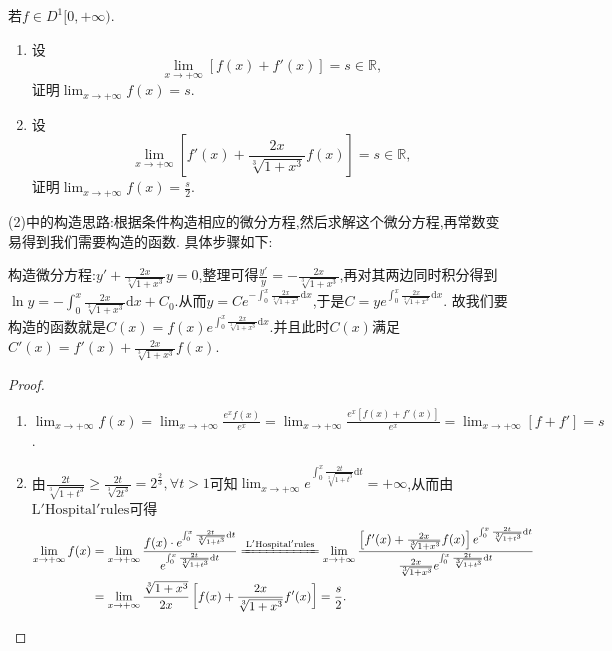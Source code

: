 \documentclass[../../main.tex]{subfiles}%
\begin{document}
\begin{example}
若\(f\in D^1[0,+\infty)\).
\begin{enumerate}[(1)]
\item 设
\[
\lim_{x\rightarrow +\infty}[f(x)+f'(x)] = s\in\mathbb{R},
\]
证明\(\lim_{x\rightarrow +\infty}f(x)=s\).

\item 设
\[
\lim_{x\rightarrow +\infty}\left[f'(x)+\frac{2x}{\sqrt[3]{1 + x^{3}}}f(x)\right]=s\in\mathbb{R},
\]
证明\(\lim_{x\rightarrow +\infty}f(x)=\frac{s}{2}\).
\end{enumerate}
\end{example}
\begin{note}
(2)中的构造思路:根据条件构造相应的微分方程,然后求解这个微分方程,再常数变易得到我们需要构造的函数. 具体步骤如下:

构造微分方程:\(y'+\frac{2x}{\sqrt[3]{1 + x^3}}y = 0\),整理可得\(\frac{y'}{y}=-\frac{2x}{\sqrt[3]{1 + x^3}}\),再对其两边同时积分得到\(\ln y = -\int_{0}^{x}\frac{2x}{\sqrt[3]{1 + x^3}}\mathrm{d}x + C_0\).从而\(y = Ce^{-\int_{0}^{x}\frac{2x}{\sqrt[3]{1 + x^3}}\mathrm{d}x}\),于是\(C = ye^{\int_{0}^{x}\frac{2x}{\sqrt[3]{1 + x^3}}\mathrm{d}x}\).
故我们要构造的函数就是\(C(x) = f(x)e^{\int_{0}^{x}\frac{2x}{\sqrt[3]{1 + x^3}}\mathrm{d}x}\).并且此时$C(x)$满足$C'\left( x \right) =f'\left( x \right) +\frac{2x}{\sqrt[3]{1+x^3}}f\left( x \right)$.
\end{note}
\begin{proof}
\begin{enumerate}[(1)]
\item $\lim_{x\rightarrow +\infty}f(x) = \lim_{x\rightarrow +\infty}\frac{e^{x}f(x)}{e^{x}}
=\lim_{x\rightarrow +\infty}\frac{e^{x}[f(x)+f'(x)]}{e^{x}}
=\lim_{x\rightarrow +\infty}[f + f']
=s$.

\item 由$\frac{2t}{\sqrt[3]{1+t^3}}\geqslant \frac{2t}{\sqrt[3]{2t^3}}=2^{\frac{2}{3}},\forall t>1$可知$\lim_{x\rightarrow +\infty} e^{\int_0^x{\frac{2t}{\sqrt[3]{1+t^3}}\mathrm{d}t}}=+\infty$,从而由$\mathrm{L}'\mathrm{Hospital}'\mathrm{rules}$可得
\begin{align*}
\lim_{x\rightarrow +\infty} f(x)&=\lim_{x\rightarrow +\infty} \frac{f(x)\cdot e^{\int_0^x{\frac{2t}{\sqrt[3]{1+t^3}}\mathrm{d}t}}}{e^{\int_0^x{\frac{2t}{\sqrt[3]{1+t^3}}\mathrm{d}t}}}\xlongequal[]{\mathrm{L}'\mathrm{Hospital}'\mathrm{rules}}\lim_{x\rightarrow +\infty} \frac{\left[ f'(x)+\frac{2x}{\sqrt[3]{1+x^3}}f(x) \right] e^{\int_0^x{\frac{2t}{\sqrt[3]{1+t^3}}\mathrm{d}t}}}{\frac{2x}{\sqrt[3]{1+x^3}}e^{\int_0^x{\frac{2t}{\sqrt[3]{1+t^3}}\mathrm{d}t}}}
\\
&=\lim_{x\rightarrow +\infty} \frac{\sqrt[3]{1+x^3}}{2x}\left[ f(x)+\frac{2x}{\sqrt[3]{1+x^3}}f'(x) \right] =\frac{s}{2}.
\end{align*}
\end{enumerate}

\end{proof}
\end{document}
